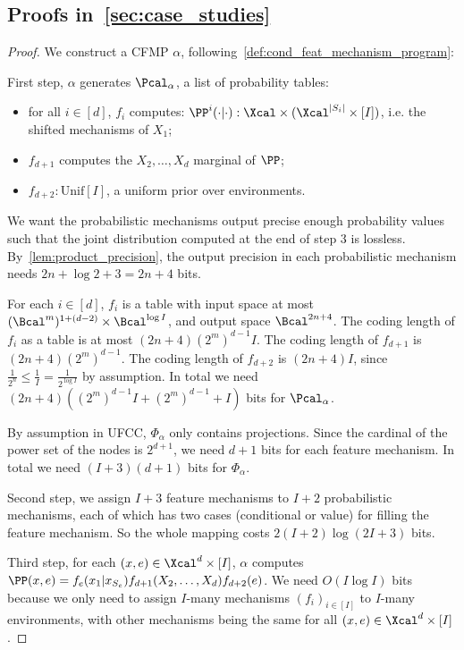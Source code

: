 \subsection{Proofs in~\texorpdfstring{\cref{sec:case_studies}}{reference}}
\propFactorizeShorter*
\begin{proof}
    We construct a CFMP $\alpha$, following~\cref{def:cond_feat_mechanism_program}:

    First step, $\alpha$ generates $\Pcal_{\alpha}$, a list of probability tables:
    \begin{itemize}
        \item for all $i\in [d]$, $f_i$ computes: $ \PP^i(\cdot| \cdot): \Xcal \times (\Xcal^{|S_i|}\times [I])$, i.e. the shifted mechanisms of $X_1$;
        \item $f_{d+1}$ computes the $X_2, \dots, X_d$ marginal of $\PP$;
        \item $f_{d+2}: \text{Unif}[I]$, a uniform prior over environments.
    \end{itemize}
    We want the probabilistic mechanisms output precise enough probability values such that the joint distribution computed at the end of step 3 is lossless. By~\cref{lem:product_precision}, the output precision in each probabilistic mechanism needs $2n+\log 2 + 3 = 2n+4$ bits.
    
    For each $i\in [d]$, $f_i$ is a table with input space at most $(\Bcal^m)^{1+(d-2)} \times \Bcal^{ \log I
    }$, and output space $\Bcal^{2n+4}$. The coding length of $f_i$ as a table is at most $(2n+4) (2^m)^{d-1} I $. The coding length of $f_{d+1}$ is $(2n+4) (2^m)^{d-1}$. The coding length of $f_{d+2}$ is $(2n+4) I $, since $\frac{1}{2^n}\leq \frac{1}{I} = \frac
    {1}{2^{\log I}}$ by assumption. In total we need $(2n+4) ( (2^m)^{d-1} I + (2^m)^{d-1} + I)$ bits for $\Pcal_\alpha$.

    By assumption in UFCC, $\Phi_\alpha$ only contains projections. Since the cardinal of the power set of the nodes is $2^{d+1}$, we need $d+1$ bits for each feature mechanism. In total we need $(I+3)(d+1)$ bits for $\Phi_\alpha$.

    Second step, we assign $I+3$ feature mechanisms to $I+2$ probabilistic mechanisms, each of which has two cases (conditional or value) for filling the feature mechanism. So the whole mapping costs $2(I+2)\log (2I+3)$ bits.

    Third step, for each $(x,e)\in \Xcal^{d} \times [I]$, $\alpha$ computes $\PP(x, e) = f_e(x_1|x_{S_e}) f_{d+1}(X_2, \dots, X_d)f_{d+2}(e)$. We need $O(I\log I)$ bits because we only need to assign $I$-many mechanisms $(f_i)_{i\in [I]}$ to $I$-many environments, with other mechanisms being the same for all $(x,e)\in \Xcal^{d} \times [I]$.


\end{proof}
